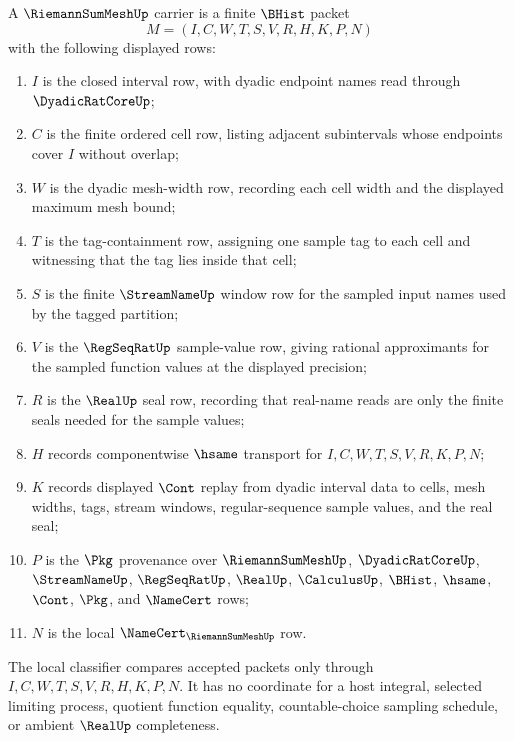 \begin{definition}
\label{def:riemann-sum-mesh-carrier}
A $\RiemannSumMeshUp$ carrier is a finite $\BHist$ packet
$$
M=(I,C,W,T,S,V,R,H,K,P,N)
$$
with the following displayed rows:
\begin{enumerate}
\item $I$ is the closed interval row, with dyadic endpoint names read through $\DyadicRatCoreUp$;
\item $C$ is the finite ordered cell row, listing adjacent subintervals whose endpoints cover $I$ without overlap;
\item $W$ is the dyadic mesh-width row, recording each cell width and the displayed maximum mesh bound;
\item $T$ is the tag-containment row, assigning one sample tag to each cell and witnessing that the tag lies inside that cell;
\item $S$ is the finite $\StreamNameUp$ window row for the sampled input names used by the tagged partition;
\item $V$ is the $\RegSeqRatUp$ sample-value row, giving rational approximants for the sampled function values at the displayed precision;
\item $R$ is the $\RealUp$ seal row, recording that real-name reads are only the finite seals needed for the sample values;
\item $H$ records componentwise $\hsame$ transport for $I,C,W,T,S,V,R,K,P,N$;
\item $K$ records displayed $\Cont$ replay from dyadic interval data to cells, mesh widths, tags, stream windows, regular-sequence sample values, and the real seal;
\item $P$ is the $\Pkg$ provenance over $\RiemannSumMeshUp$, $\DyadicRatCoreUp$, $\StreamNameUp$, $\RegSeqRatUp$, $\RealUp$, $\CalculusUp$, $\BHist$, $\hsame$, $\Cont$, $\Pkg$, and $\NameCert$ rows;
\item $N$ is the local $\NameCert_{\RiemannSumMeshUp}$ row.
\end{enumerate}
The local classifier compares accepted packets only through $I,C,W,T,S,V,R,H,K,P,N$. It has no coordinate for a host integral, selected limiting process, quotient function equality, countable-choice sampling schedule, or ambient $\RealUp$ completeness.
\end{definition}

